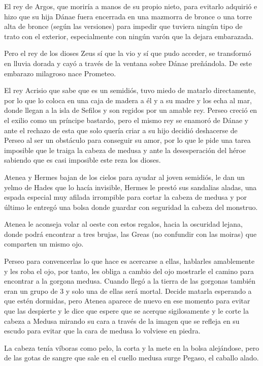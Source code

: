 El rey de Argos, que moriría a manos de su propio nieto, para evitarlo adquirió e hizo que su hija Dánae fuera encerrada en una mazmorra de bronce o una torre alta de bronce (según las versiones) para impedir que tuviera ningún tipo de trato con el exterior, especialmente con ningún varón que la dejara embarazada.

Pero el rey de los dioses Zeus sí que la vio y sí que pudo acceder, se transformó en lluvia dorada y cayó a través de la ventana sobre Dánae preñándola. De este embarazo milagroso nace Prometeo.

El rey Acrisio que sabe que es un semidiós, tuvo miedo de matarlo directamente, por lo que lo coloca en una caja de madera a él y a su madre y los echa al mar, donde llegan a la isla de Sefilos y son regidos por un amable rey. Perseo creció en el exilio como un príncipe bastardo, pero el mismo rey se enamoró de Dánae y ante el rechazo de esta que solo quería criar a su hijo decidió deshacerse de Perseo al ser un obstáculo para conseguir su amor, por lo que le pide una tarea imposible que le traiga la cabeza de medusa y ante la desesperación del héroe sabiendo que es casi imposible este reza los dioses.

Atenea y Hermes bajan de los cielos para ayudar al joven semidiós, le dan un yelmo de Hades que lo hacía invisible, Hermes le prestó sus sandalias aladas, una espada especial muy afilada irrompible para cortar la cabeza de medusa y por último le entregó una bolsa donde guardar con seguridad la cabeza del monstruo.

Atenea le aconseja volar al oeste con estos regalos, hacia la oscuridad lejana, donde podrá encontrar a tres brujas, las Greas (no confundir con las moiras) que comparten un mismo ojo.

Perseo para convencerlas lo que hace es acercarse a ellas, hablarles amablemente y les roba el ojo, por tanto, les obliga a cambio del ojo mostrarle el camino para encontrar a la gorgona medusa. Cuando llegó a la tierra de las gorgonas también eran un grupo de 3 y solo una de ellas será mortal. Decide matarla esperando a que estén dormidas, pero Atenea aparece de nuevo en ese momento para evitar que las despierte y le dice que espere que se acerque sigilosamente y le corte la cabeza a Medusa mirando su cara a través de la imagen que se refleja en su escudo para evitar que la cara de medusa lo volviese en piedra.

La cabeza tenía víboras como pelo, la corta y la mete en la bolsa alejándose, pero de las gotas de sangre que sale en el cuello medusa surge Pegaso, el caballo alado.

